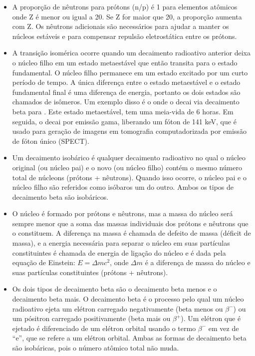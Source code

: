 \documentclass[11pt,a4paper]{article}
\newcounter{exemplo}
\begin{document}
\begin{exemplo}
\begin{itemize}
	   \item A proporção de nêutrons para prótons (n/p) é 1 para elementos atômicos onde Z é menor ou igual a 20. Se Z for maior que 20, a proporção aumenta com Z. Os nêutrons adicionais são necessários para ajudar a manter os núcleos estáveis e para compensar repulsão eletrostática entre os prótons.
	   
	   \item A transição isomérica ocorre quando um decaimento radioativo anterior deixa o núcleo filho em um estado metaestável que então transita para o estado fundamental. O núcleo filho permanece em um estado excitado por um curto período de tempo. A única diferença entre o estado metaestável e o estado fundamental final é uma diferença de energia, portanto os dois estados são chamados de isômeros. Um exemplo disso é o  onde o  decai via decaimento beta para . Este estado metaestável, tem uma meia-vida de 6 horas. Em seguida, o  decai por emissão gama, liberando um fóton de 141 keV, que é usado para geração de imagens em tomografia computadorizada por emissão de fóton único (SPECT).
	   
	   \item Um decaimento isobárico é qualquer decaimento radioativo no qual o núcleo original (ou núcleo pai) e o novo (ou núcleo filho) contém o mesmo número total de núcleons (prótons + nêutrons). Quando isso ocorre, o núcleo pai e o núcleo filho são referidos como isóbaros um do outro. Ambos os tipos de decaimento beta são isobáricos.
	   
	   \item O núcleo é formado por prótons e nêutrons, mas a massa do núcleo será sempre menor que a soma das massas individuais dos prótons e nêutrons que o constituem. A diferença na massa é chamada de defeito de massa (déficit de massa), e a energia necessária para separar o núcleo em suas partículas constituintes é chamada de energia de ligação do núcleo e é dada pela equação de Einstein: $E = \Delta mc^2$, onde $\Delta m$ é a diferença de massa do núcleo e suas partículas constituintes (prótons + nêutrons).
	   
	   \item Os dois tipos de decaimento beta são o decaimento beta menos e o decaimento beta mais. O decaimento beta é o processo pelo qual um núcleo radioativo ejeta um elétron carregado negativamente (beta menos ou $\beta^-$) ou um pósitron carregado positivamente (beta mais ou $\beta^+$). Um elétron que é ejetado é diferenciado de um elétron orbital usando o termo $\beta^-$ em vez de “e”, que se refere a um elétron orbital. Ambas as formas de decaimento beta são isobáricas, pois o número atômico total não muda.
	   

\end{itemize}
\end{exemplo}
\end{document}
